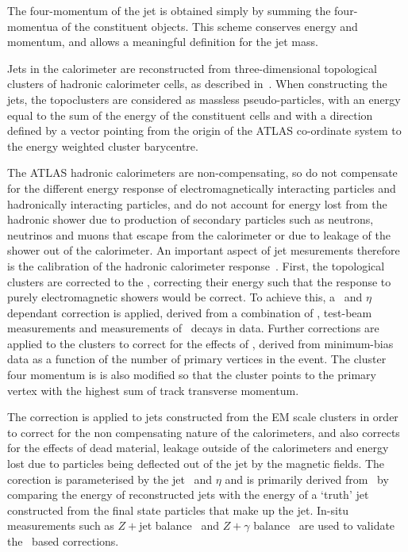 The four-momentum of the jet is obtained simply by summing the four-momentua of
the constituent objects. This scheme conserves energy and momentum, and allows a
meaningful definition for the jet mass.

Jets in the calorimeter are reconstructed from three-dimensional topological clusters of hadronic
calorimeter cells, as described in~. When constructing the jets, the
topoclusters are considered as massless pseudo-particles, with an energy equal
to the sum of the energy of the constituent cells and with a direction defined
by a vector pointing from the origin of the ATLAS co-ordinate system to the energy weighted cluster barycentre.


The ATLAS hadronic calorimeters are non-compensating, so do not
compensate for the different energy response of electromagnetically interacting
particles and hadronically interacting particles, and do not account for energy 
lost from the hadronic shower due to production of
secondary particles such as neutrons, neutrinos and muons that escape from the calorimeter
or due to leakage of the shower out of the calorimeter. 
An important aspect of jet mesurements therefore is the calibration of the hadronic
calorimeter response~\cite{cat_thesis}. First, the topological clusters are corrected to the , correcting their energy such that the response to purely electromagnetic
showers
would be correct. To achieve this, a \pt\ and $\eta$ dependant correction is
applied, derived from a combination of \mcsim, test-beam measurements and
measurements of \Zee\ decays in data. Further corrections are applied to the
clusters to correct for the effects of \pu, derived from minimum-bias
data as a function of the number of primary vertices in the event. 
The cluster four momentum is is also modified so that the
cluster points to the primary vertex with the highest sum of track
transverse momentum. 

The  correction is
applied to jets constructed from the EM scale clusters in order to correct for the non compensating nature of the calorimeters, and also
corrects for the effects of dead material, leakage outside of the
calorimeters and energy lost due to particles being deflected out of the jet by
the magnetic fields. The corection is parameterised by
the jet \pt\ and $\eta$ and is primarily derived from \mcsim\ by comparing the
energy of reconstructed jets with the energy of a `truth' jet constructed from
the final state particles that make up the jet. In-situ measurements such as
$Z+$jet balance~\cite{ATLAS-CONF-2012-053} and $Z+\gamma$ balance~\cite{ATLAS-CONF-2012-063} are used to validate the \mc\ based corrections.



